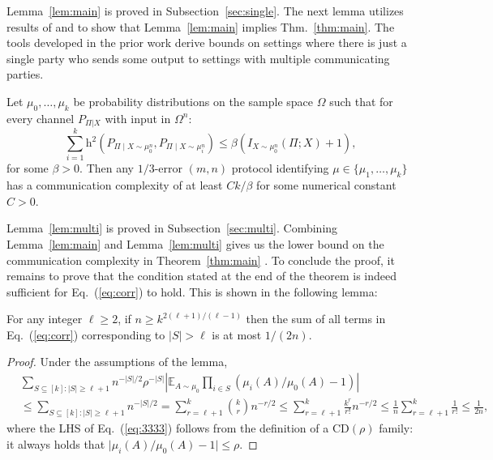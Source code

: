 \documentclass[final, 12pt]{colt2018}
\providecommand{\helli}{\mathrm{h}}
\providecommand{\CD}{\mathrm{CD}}
\newcommand{\subsecref}[1]{Subsection~\ref{#1}}
\renewcommand{\eqref}[1]{Eq.~(\ref{#1})}
\newcommand{\lemref}[1]{Lemma~\ref{#1}}
\newcommand{\thmref}[1]{Thm.~\ref{#1}}
\begin{document}
\lemref{lem:main} is proved in \subsecref{sec:single}.
The next lemma utilizes results of \cite{jayram2009hellinger} and \cite{braverman2016communication} to show that \lemref{lem:main} implies \thmref{thm:main}. The tools developed in the prior work derive bounds on settings where there is just a single party who sends some output to settings with multiple communicating parties.

\begin{lemma} \label{lem:multi}
Let $\mu_0, \dots, \mu_k$ be probability distributions on the sample space $\Omega$ such that for every channel $P_{\Pi | X}$ with input in $\Omega^n$: 
\[
\sum_{i=1}^k \helli^2(P_{\Pi \mid X\sim \mu_0^n}, P_{\Pi \mid X \sim \mu_i^n})
\le \beta(I_{X \sim \mu_0^n}(\Pi ; X) + 1),
\]
for some $\beta > 0$. Then any $1/3$-error $(m,n)$ protocol identifying $\mu \in \{\mu_1, \dots, \mu_k \}$ has a communication complexity of at least $Ck/\beta$ for some numerical constant $C>0$.
\end{lemma}

\lemref{lem:multi} is proved in \subsecref{sec:multi}. Combining Lemma~\ref{lem:main} and Lemma~\ref{lem:multi} gives us the lower bound on the communication complexity in Theorem~\ref{thm:main} . To conclude the proof, it remains to prove that the condition stated at the end of the theorem is indeed sufficient for \eqref{eq:corr} to hold. This is shown in the following lemma:

\begin{lemma} \label{lem:nk6}
For any integer $\ell \ge 2$, if $n \ge k^{2(\ell+1)/(\ell-1)}$ then the sum of all terms in \eqref{eq:corr} corresponding to $\lvert S \rvert> \ell$ is at most $1/(2n)$.
\end{lemma}

\begin{proof}
Under the assumptions of the lemma,
\begin{align}
&\sum_{S \subseteq [k] \colon \lvert S \rvert \ge \ell+1} n^{-\lvert S \rvert/2} \rho^{-\lvert S \rvert} \left\lvert \mathbb{E}_{A \sim \mu_0} \prod_{i\in S} (\mu_i(A)/\mu_0(A) - 1) \right\rvert \nonumber\\
&\le\sum_{S \subseteq [k] \colon \lvert S \rvert \ge \ell+1} n^{-\lvert S \rvert/2} 
= \sum_{r = \ell+1}^k {\binom{k}{r}} n^{-r/2}
\le \sum_{r = \ell+1}^k \frac{k^r}{r!} n^{-r/2}
\le \frac{1}{n} \sum_{r = \ell+1}^k \frac{1}{r!}
\le \frac{1}{2n}, \label{eq:3333}
\end{align}
where the LHS of \eqref{eq:3333} follows from the definition of a $\CD(\rho)$ family: it always holds that $\lvert\mu_i(A)/\mu_0(A) -1 \rvert \le \rho$.
\end{proof}
\end{document}
